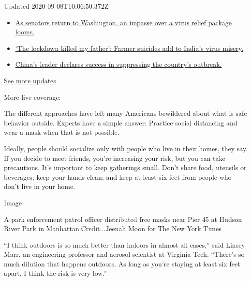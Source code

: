 Updated 2020-09-08T10:06:50.372Z

\begin{itemize}
\tightlist
\item
  \href{https://www.nytimes3xbfgragh.onion/2020/09/08/world/covid-19-coronavirus.html?action=click\&pgtype=Article\&state=default\&region=MAIN_CONTENT_1\&context=storylines_live_updates\#link-4a77847f}{As
  senators return to Washington, an impasse over a virus relief package
  looms.}
\item
  \href{https://www.nytimes3xbfgragh.onion/2020/09/08/world/covid-19-coronavirus.html?action=click\&pgtype=Article\&state=default\&region=MAIN_CONTENT_1\&context=storylines_live_updates\#link-1c973131}{`The
  lockdown killed my father': Farmer suicides add to India's virus
  misery.}
\item
  \href{https://www.nytimes3xbfgragh.onion/2020/09/08/world/covid-19-coronavirus.html?action=click\&pgtype=Article\&state=default\&region=MAIN_CONTENT_1\&context=storylines_live_updates\#link-adc17f7}{China's
  leader declares success in suppressing the country's outbreak.}
\end{itemize}

\href{https://www.nytimes3xbfgragh.onion/2020/09/08/world/covid-19-coronavirus.html?action=click\&pgtype=Article\&state=default\&region=MAIN_CONTENT_1\&context=storylines_live_updates}{See
more updates}

More live coverage:

The different approaches have left many Americans bewildered about what
is safe behavior outside. Experts have a simple answer: Practice social
distancing and wear a mask when that is not possible.

Ideally, people should socialize only with people who live in their
homes, they say. If you decide to meet friends, you're increasing your
risk, but you can take precautions. It's important to keep gatherings
small. Don't share food, utensils or beverages; keep your hands clean;
and keep at least six feet from people who don't live in your home.

Image

A park enforcement patrol officer distributed free masks near Pier 45 at
Hudson River Park in Manhattan.Credit...Jeenah Moon for The New York
Times

``I think outdoors is so much better than indoors in almost all cases,''
said Linsey Marr, an engineering professor and aerosol scientist at
Virginia Tech. ``There's so much dilution that happens outdoors. As long
as you're staying at least six feet apart, I think the risk is very
low.''

